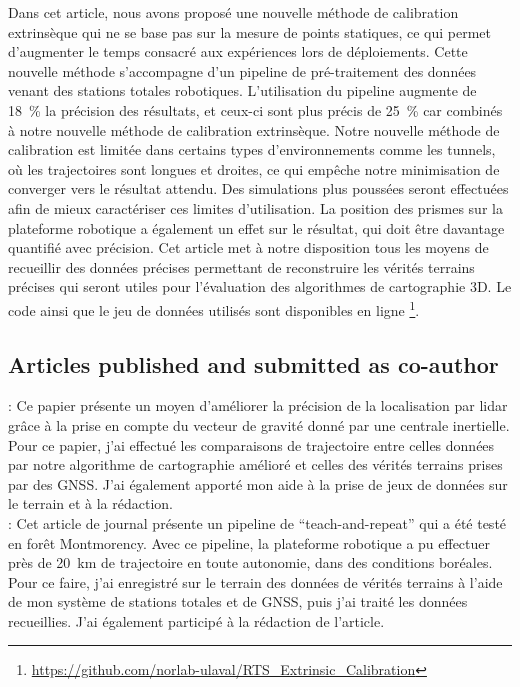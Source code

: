 Dans cet article, nous avons proposé une nouvelle méthode de calibration extrinsèque qui ne se base pas sur la mesure de points statiques, ce qui permet d'augmenter le temps consacré aux expériences lors de déploiements.
Cette nouvelle méthode s'accompagne d'un pipeline de pré-traitement des données venant des stations totales robotiques. 
L'utilisation du pipeline augmente de \SI{18}{\%} la précision des résultats, et ceux-ci sont plus précis de \SI{25}{\%} car combinés à notre nouvelle méthode de calibration extrinsèque.
Notre nouvelle méthode de calibration est limitée dans certains types d'environnements comme les tunnels, où les trajectoires sont longues et droites, ce qui empêche notre minimisation de converger vers le résultat attendu.
Des simulations plus poussées seront effectuées afin de mieux caractériser ces limites d'utilisation.
La position des prismes sur la plateforme robotique a également un effet sur le résultat, qui doit être davantage quantifié avec précision. 
Cet article met à notre disposition tous les moyens de recueillir des données précises permettant de reconstruire les vérités terrains précises qui seront utiles pour l'évaluation des algorithmes de cartographie 3D.
Le code ainsi que le jeu de données utilisés sont disponibles en ligne \footnote{\url{https://github.com/norlab-ulaval/RTS_Extrinsic_Calibration}}.

\subsection{Articles published and submitted as co-author}

\textbf{}: 
Ce papier présente un moyen d'améliorer la précision de la localisation par lidar grâce à la prise en compte du vecteur de gravité donné par une centrale inertielle. 
Pour ce papier, j'ai effectué les comparaisons de trajectoire entre celles données par notre algorithme de cartographie amélioré et celles des vérités terrains prises par des \ac{GNSS}. 
J'ai également apporté mon aide à la prise de jeux de données sur le terrain et à la rédaction.
\\

\textbf{}:
Cet article de journal présente un pipeline de ``teach-and-repeat'' qui a été testé en forêt Montmorency. 
Avec ce pipeline, la plateforme robotique a pu effectuer près de \SI{20}{km} de trajectoire en toute autonomie, dans des conditions boréales. 
Pour ce faire, j'ai enregistré sur le terrain des données de vérités terrains à l'aide de mon système de stations totales et de \ac{GNSS}, puis j'ai traité les données recueillies. 
J'ai également participé à la rédaction de l'article.
\\

